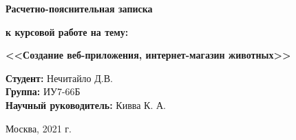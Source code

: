 \documentclass[a4paper, 14pt]{extreport}
\begin{document}
 	\vspace*{20mm}
 	
 	\LARGE
 	\begin{center}
 		\textbf{Расчетно-пояснительная записка}
 		
 		\textbf{к курсовой работе на тему:}
 		
 		\textbf{<<Создание веб-приложения, интернет-магазин животных>>}
 	\end{center}
 	
 	\vspace*{15mm}
 	
 	\large
 	\begin{flushleft}
 		\textbf{Студент:} Нечитайло Д.В. \\
 		\textbf{Группа:} ИУ7-66Б \\
 		\textbf{Научный руководитель:} Кивва К. А.
 	\end{flushleft}
 	
 	\vspace*{30mm}
 	
 	\large
 	\begin{center}
 		Москва, 2021 г.
 	\end{center}
 	
 	\thispagestyle{empty}
 	
 	\newpage

    \tableofcontents
    
    
    
    
    
\end{document}
